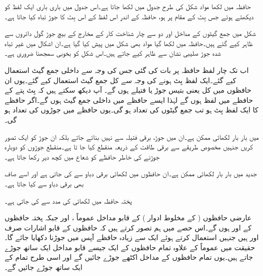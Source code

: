 حافظہ میں  لکھا  مواد شکل کی طرح جدول میں لکھا جاتا ہے۔اس جدول میں    باری باری ایک لفظ کو  دیکھتے ہوئے جس بِٹ کے مقام پر  ہو،  حافظہ کے اندر اس لفظ کے اس بِٹ کا جوڑ تباہ کیا جاتا ہے۔


شکل  میں  جمع گیٹوں کے مداخل اور دو سے چار شناخت کار کے مخارج کے  بیچ جوڑ گول دائروں سے  ظاہر کیے  گئے ہیں۔حافظہ میں لکھا گیا مواد بھی شکل  میں پیش کیا گیا ہے۔ان  اشکال میں غیر تباہ شدہ جوڑ  صلیبی نشان   سے ظاہر کیے  جاتے ہیں۔اس شکل کو بخوبی سمجھنا  ضروری ہے۔

اب تک  چار لفظ  حافظہ  پر بات کی گئی جس کی وجہ سے   داخلی جمع گیٹ استعمال کیے گئے۔ایک لفظ   بِٹ ہونے کی وجہ سے کل   جمع گیٹ استعمال کیے گئے۔یوں  ان حافظوں  میں کل  یعنی  بتیس    جوڑ یا  فتیلے  ہوں گے۔ آپ دیکھ سکتے ہیں کہ  بِٹ پتے    کے حافظے میں   لفظ ہوں گے لہٰذا ایسے حافظے میں   داخلی جمع گیٹ  ہوں گے۔اگر حافظے  کا ایک لفظ  بِٹ ہو تب جمع گیٹوں کی تعداد  ہو گی۔یوں حافظے میں جوڑوں کی تعداد   ہو گی۔

 میں بار بار لکھائی ممکن ہے۔ان  میں   جوڑ، برقی فتیلہ سے نہیں بنائے جاتے بلکہ ان   جوڑ کو ایک تصور  کریں جنہیں مخصوص طریقے سے برقی طاقت کے ذریعہ منقطع کیا جا تا ہے۔منقطع جوڑوں کو دوبارہ جوڑنے کی خاطر حافظے  کو شعاع  میں کچھ دیر رکھا جاتا ہے۔

جدید میں  بار بار لکھائی ممکن ہے۔ان حافظوں میں لکھائی برقی دباو سے کی جاتی ہے اور اسے صاف بھی برقی دباو سے  کیا جاتا ہے۔

پختہ حافظہ میں لکھائی  کی مدد سے کی جاتی ہے۔
	

عارضی حافظوں ( کے   مخلوط  ادوار ) کے قابو  مداخل   عموماً ،   اور    جبکہ پختہ حافظوں کے    اور    ہوں گے۔اس حصے میں  ہم تصور کرتے ہیں کہ  حافظوں   کے قابو  اشارات صرف  اور     ہیں  جنہیں  استعمال کرتے ہوئے   ایک سے زیادہ حافظے آپس میں جوڑنا دکھایا جائے گا۔حقیقت میں  عموماً    کے علاوہ تمام حافظوں کے ایک جیسے قابو مداخل  ایک ساتھ جوڑے جاتے ہیں۔یوں تمام حافظوں  کے     مداخل اکٹھے جوڑے جائیں گے اور اسی طرح    تمام کے      ایک ساتھ جوڑے جائیں گے۔

